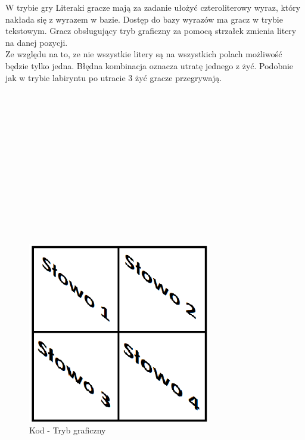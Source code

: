 \hspace{-0.60cm}W trybie gry Literaki gracze mają za zadanie ułożyć czteroliterowy wyraz, który nakłada się z wyrazem w bazie. Dostęp do bazy wyrazów ma gracz w trybie tekstowym. Gracz obsługujący tryb graficzny za pomocą strzałek zmienia litery na danej pozycji. 
\\Ze względu na to, ze nie wszystkie litery są na wszystkich polach możliwość będzie tylko jedna. Błędna kombinacja oznacza utratę jednego z żyć. Podobnie jak w trybie labiryntu po utracie 3 żyć gracze przegrywają.
\\
\\
\\
\\
\\
\\
\\
\\
\\
\\
\\
\\
\\
\\
	\begin{figure}[!htb]
	\begin{center}
		\includegraphics[width=8cm]{rys/gra5.png}
		\caption{Kod - Tryb graficzny}
		\label{rys:rysunek001}
	\end{center}
\end{figure}

